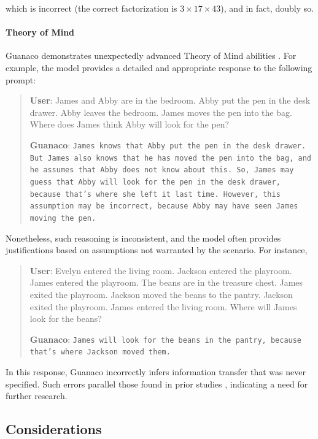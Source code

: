 which is incorrect (the correct factorization is $3 \times 17 \times 43$), and in fact, doubly so.

\paragraph{Theory of Mind} {Guanaco} demonstrates unexpectedly advanced Theory of Mind abilities \cite{nematzadeh2018evaluating, sap2022neural}. For example, the model provides a detailed and appropriate response to the following prompt:

\begin{quote}
    \textbf{User}: James and Abby are in the bedroom. Abby put the pen in the desk drawer. Abby leaves the bedroom. James moves the pen into the bag. Where does James think Abby will look for the pen?

    \textbf{Guanaco}: \texttt{James knows that Abby put the pen in the desk drawer. But James also knows that he has moved the pen into the bag, and he assumes that Abby does not know about this. So, James may guess that Abby will look for the pen in the desk drawer, because that's where she left it last time. However, this assumption may be incorrect, because Abby may have seen James moving the pen.}
\end{quote}

Nonetheless, such reasoning is inconsistent, and the model often provides justifications based on assumptions not warranted by the scenario. For instance,

\begin{quote}
    \textbf{User}: Evelyn entered the living room. Jackson entered the playroom. James entered the playroom. The beans are in the treasure chest. James exited the playroom. Jackson moved the beans to the pantry. Jackson exited the playroom. James entered the living room. Where will James look for the beans?

    \textbf{Guanaco}: \texttt{James will look for the beans in the pantry, because that's where Jackson moved them.}
\end{quote}

In this response, {Guanaco} incorrectly infers information transfer that was never specified. Such errors parallel those found in prior studies \cite{sap2022neural}, indicating a need for further research.

\subsection{Considerations}
\label{ssec:considerations}

